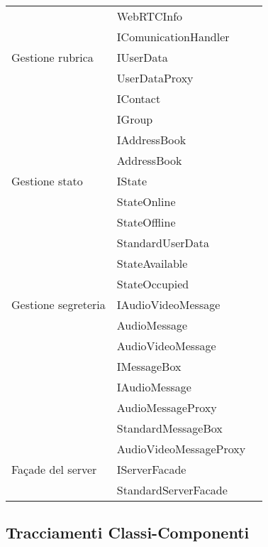 \begin{center}
\begin{longtable}{lp{}l}
 & WebRTCInfo \\
 & IComunicationHandler \\
Gestione rubrica & IUserData \\
 & UserDataProxy \\
 & IContact \\
 & IGroup \\
 & IAddressBook \\
 & AddressBook \\
Gestione stato & IState \\
 & StateOnline \\
 & StateOffline \\
 & StandardUserData \\
 & StateAvailable \\
 & StateOccupied \\
Gestione segreteria & IAudioVideoMessage \\
 & AudioMessage \\
 & AudioVideoMessage \\
 & IMessageBox \\
 & IAudioMessage \\
 & AudioMessageProxy \\
 & StandardMessageBox \\
 & AudioVideoMessageProxy \\
Façade del server & IServerFacade \\
 & StandardServerFacade \\
\bottomrule
\end{longtable}
\end{center}
\subsection{Tracciamenti Classi-Componenti}\label{sec:tracClassComp}

